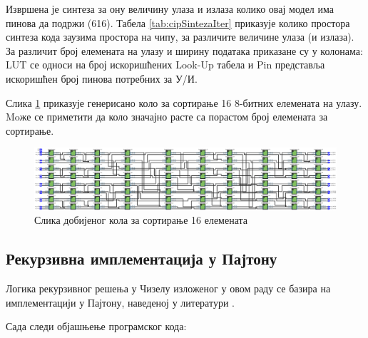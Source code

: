 \documentclass[12pt, a4paper]{article}
\theoremstyle{definition}
\begin{document}
Извршена је синтеза за ону величину улаза и излаза колико овај модел има пинова да подржи (616). Табела \ref{tab:cipSintezaIter} приказује колико простора синтеза кода заузима простора на чипу, за различите величине улаза (и излаза). За различит број елемената на улазу и ширину података приказане су у колонама: LUT се односи на број искоришћених Look-Up табела и Pin представља искоришћен број пинова потребних за У/И.

\newpage
Слика \ref{fig:RTL_Iter} приказује генерисано коло за сортирање 16 8-битних елемената на улазу. Moже се приметити да коло значајно расте са порастом број елемената за сортирање.

\begin{figure}[H]
  \centering
      \includegraphics[scale=0.24]{slike/RTL_Iter_16_8.png}
  \caption{Слика добијеног кола за сортирање 16 елемената}
  \label{fig:RTL_Iter}
\end{figure}

\newpage
\subsection{Рекурзивна имплементација у Пајтону}

Логика рекурзивног решења у Чизелу изложеног у овом раду се базира на имплементацији у Пајтону, наведеној у литератури \cite{geeks}.

%
%
%
Сада следи објашњење програмског кода:
\end{document}
